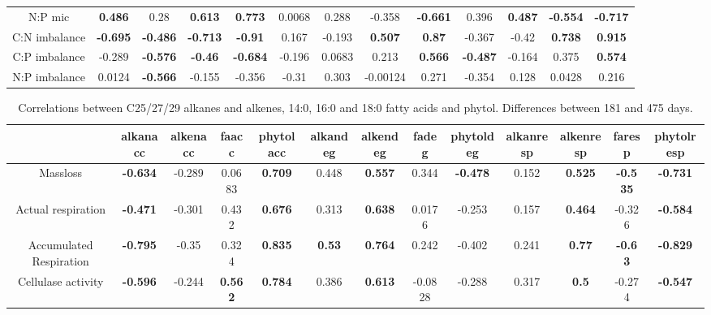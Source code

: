 \documentclass[authoryear,preprint,review,12pt]{elsarticle}
\begin{document}
\begin{landscape}
\begin{table}[h!]
\begin{center}
{\begin{tabular}{ccccccccccccc}
  N:P mic & \textbf{ 0.486 } & 0.28 & \textbf{ 0.613 } & \textbf{ 0.773 } & 0.0068 & 0.288 & -0.358 & \textbf{ -0.661 } & 0.396 & \textbf{ 0.487 } & \textbf{ -0.554 } & \textbf{ -0.717 } \\ 
  C:N imbalance & \textbf{ -0.695 } & \textbf{ -0.486 } & \textbf{ -0.713 } & \textbf{ -0.91 } & 0.167 & -0.193 & \textbf{ 0.507 } & \textbf{ 0.87 } & -0.367 & -0.42 & \textbf{ 0.738 } & \textbf{ 0.915 } \\ 
  C:P imbalance & -0.289 & \textbf{ -0.576 } & \textbf{ -0.46 } & \textbf{ -0.684 } & -0.196 & 0.0683 & 0.213 & \textbf{ 0.566 } & \textbf{ -0.487 } & -0.164 & 0.375 & \textbf{ 0.574 } \\ 
  N:P imbalance & 0.0124 & \textbf{ -0.566 } & -0.155 & -0.356 & -0.31 & 0.303 & -0.00124 & 0.271 & -0.354 & 0.128 & 0.0428 & 0.216 \\ 
   \hline
\end{tabular}
}
\end{center}
\end{table}
\newpage
\begin{table}[h!]
\begin{center}
\caption{Correlations between C25/27/29 alkanes and alkenes, 14:0, 16:0 and 18:0 fatty acids and phytol. Differences between 181 and 475 days.}
\label{corrtable2_notlig}
{\tiny
\begin{tabular}{ccccccccccccc}
  \hline
 & alkanacc & alkenacc & faacc & phytolacc & alkandeg & alkendeg & fadeg & phytoldeg & alkanresp & alkenresp & faresp & phytolresp \\ 
  \hline
Massloss & \textbf{ -0.634 } & -0.289 & 0.0683 & \textbf{ 0.709 } & 0.448 & \textbf{ 0.557 } & 0.344 & \textbf{ -0.478 } & 0.152 & \textbf{ 0.525 } & \textbf{ -0.535 } & \textbf{ -0.731 } \\ 
  Actual respiration & \textbf{ -0.471 } & -0.301 & 0.432 & \textbf{ 0.676 } & 0.313 & \textbf{ 0.638 } & 0.0176 & -0.253 & 0.157 & \textbf{ 0.464 } & -0.326 & \textbf{ -0.584 } \\ 
  Accumulated Respiration & \textbf{ -0.795 } & -0.35 & 0.324 & \textbf{ 0.835 } & \textbf{ 0.53 } & \textbf{ 0.764 } & 0.242 & -0.402 & 0.241 & \textbf{ 0.77 } & \textbf{ -0.63 } & \textbf{ -0.829 } \\ 
  Cellulase activity & \textbf{ -0.596 } & -0.244 & \textbf{ 0.562 } & \textbf{ 0.784 } & 0.386 & \textbf{ 0.613 } & -0.0828 & -0.288 & 0.317 & \textbf{  0.5 } & -0.274 & \textbf{ -0.547 } \\ 

\end{tabular}}
\end{center}
\end{table}
\end{landscape}
\end{document}
